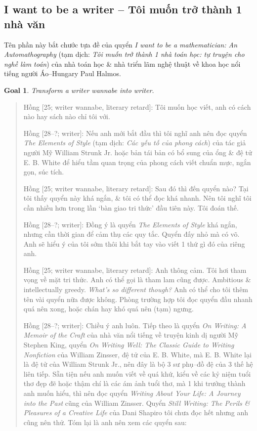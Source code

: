 \documentclass[12pt]{article}
\newtheorem{goal}{Goal}
\begin{document}
\subsection{I want to be a writer -- Tôi muốn trở thành 1 nhà văn}
\label{sect: writer wannabe}
Tên phần này bắt chước tựa đề của quyển {\it I want to be a mathematician: An Automathography} \cite{Halmos1985,Halmos1985_3_parts} (tạm dịch: {\it Tôi muốn trở thành 1 nhà toán học: tự truyện cho nghề làm toán}) của nhà toán học \& nhà triển lãm nghệ thuật về khoa học nổi tiếng người Áo--Hungary {\sc Paul Halmos}.

\begin{goal}
	Transform a writer wannabe into writer.
\end{goal}

\begin{quote}
	{\sf Hồng [25; writer wannabe, literary retard]}: Tôi muốn học viết, anh có cách nào hay sách nào chỉ tôi với.
	
	{\sf Hồng [28--?; writer]}: Nếu anh mới bắt đầu thì tôi nghĩ anh nên đọc quyển {\it The Elements of Style} \cite{Strunk_element_style} (tạm dịch: {\it Các yếu tố của phong cách}) của tác giả người Mỹ {\sc William Strunk Jr.} hoặc bản tái bản có bổ sung \cite{Strunk_White_element_style} của ổng \& đệ tử {\sc E. B. White} để hiểu tầm quan trọng của phong cách viết chuẩn mực, ngắn gọn, súc tích.
	
	{\sf Hồng [25; writer wannabe, literary retard]}: Sau đó thì đến quyển nào? Tại tôi thấy quyển này khá ngắn, \& tôi có thể đọc khá nhanh. Nên tôi nghĩ tôi cần nhiều hơn trong lần `bàn giao tri thức' đầu tiên này. Tôi đoán thế.
	
	{\sf Hồng [28--?; writer]}: Đồng ý là quyển {\it The Elements of Style} khá ngắn, nhưng cần thời gian để cảm thụ các quy tắc. Quyển đấy nhỏ mà có võ. Anh sẽ hiểu ý của tôi sớm thôi khi bắt tay vào viết 1 thứ gì đó của riêng anh.
	
	{\sf Hồng [25; writer wannabe, literary retard]}: Anh thông cảm. Tôi hơi tham vọng về mặt tri thức. Anh có thể gọi là tham lam cũng được. Ambitious \& intellectually greedy. {\it What's so different though?} Anh có thể cho tôi thêm tên vài quyển nữa được không. Phòng trường hợp tôi đọc quyển đầu nhanh quá nên xong, hoặc chán hay khó quá nên (tạm) ngưng.
	
	{\sf Hồng [28--?; writer]}: Chiều ý anh luôn. Tiếp theo là quyển {\it On Writing: A Memoir of the Craft} \cite{King2000,King2010} của nhà văn nổi tiếng về truyện kinh dị người Mỹ {\sc Stephen King}, quyển {\it On Writing Well: The Classic Guide to Writing Nonfiction} \cite{Zinsser2001,Zinsser2016} của {\sc William Zinsser}, đệ tử của {\sc E. B. White}, mà {\sc E. B. White} lại là đệ tử của {\sc William Strunk Jr.}, nên đây là bộ 3 sư phụ--đồ đệ của 3 thế hệ liên tiếp. Sẵn tiện nếu anh muốn viết về quá khứ, kiểu về các kỷ niệm tuổi thơ đẹp đẽ hoặc thậm chí là các ám ảnh tuổi thơ, mà 1 khi trưởng thành anh muốn hiểu, thì nên đọc quyển {\it Writing About Your Life: A Journey into the Past} \cite{Zinsser2005} cũng của {\sc William Zinsser}. Quyển {\it Still Writing: The Perils \& Pleasures of a Creative Life} của {\sc Dani Shapiro} tôi chưa đọc hết nhưng anh cũng nên thử. Tóm lại là anh nên xem các quyển sau:
\end{quote}
\end{document}
